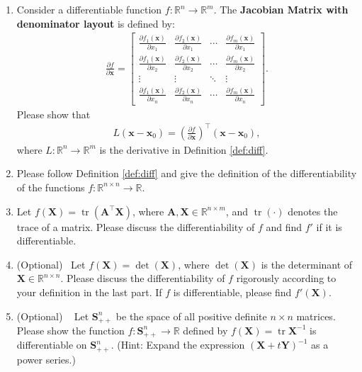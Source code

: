 \documentclass[11pt,letter,notitlepage]{article}
\newcommand{\tr}{ \operatorname{tr}  }
\theoremstyle{definition}
\begin{document}
\begin{exercise}
\begin{enumerate}
\begin{enumerate}
			\end{enumerate}
            \item Consider a differentiable function $f:\mathbb{R}^n\to\mathbb{R}^m$. The \textbf{Jacobian Matrix with denominator layout} is defined by:
            \begin{align*}
                \frac{\partial f}{\partial \mathbf{x}} = \left[
                \begin{matrix}
                    \displaystyle \frac{\partial f_1 (\mathbf{x})}{\partial x_1} & \displaystyle\frac{\partial f_2 (\mathbf{x})}{\partial x_1} & \cdots & \displaystyle\frac{\partial f_m (\mathbf{x})}{\partial x_1} \\
                    \displaystyle\frac{\partial f_1 (\mathbf{x})}{\partial x_2} & \displaystyle\frac{\partial f_2 (\mathbf{x})}{\partial x_2} & \cdots & \displaystyle\frac{\partial f_m (\mathbf{x})}{\partial x_2} \\
                    \vdots & \vdots & \ddots & \vdots \\
                    \displaystyle \frac{\partial f_1 (\mathbf{x})}{\partial x_n} & \displaystyle\frac{\partial f_2 (\mathbf{x})}{\partial x_n} & \cdots & \displaystyle\frac{\partial f_m (\mathbf{x})}{\partial x_n}
                \end{matrix}\right].
            \end{align*}
            Please show that
            \begin{align*}
                L(\mathbf{x} - \mathbf{x}_0) = \left( \frac{\partial f}{\partial \mathbf{x}} \right)^\top (\mathbf{x} - \mathbf{x}_0),
            \end{align*}
            where $L:\mathbb{R}^n\to\mathbb{R}^m$ is the derivative in Definition \ref{def:diff}.
			\item Please follow Definition \ref{def:diff} and give the definition of the differentiability of the functions $f:\mathbb{R}^{n\times n}\rightarrow\mathbb{R}$.
			\item Let $f(\mathbf{X})=\tr(\mathbf{A}^{\top}\mathbf{X})$, where $\mathbf{A},\mathbf{X}\in\mathbb{R}^{n\times m}$, and $\tr(\cdot)$ denotes the trace of a matrix. Please discuss the differentiability of $f$ and find $f'$ if it is differentiable.
			\item (Optional)~ Let $f(\mathbf{X}) = \det(\mathbf{X})$, where $\det(\mathbf{X})$ is the determinant of $\mathbf{X} \in \mathbb{R}^{n \times n}$. Please discuss the differentiability of $f$ rigorously according to your definition in the last part. If $f$ is differentiable, please find $f'(\mathbf{X})$.
			\item (Optional) ~ Let $\mathbf{S}_{++}^n$ be the space of all positive definite $n\times n$ matrices. Please show the function $f: \mathbf{S}_{++}^{n} \rightarrow \mathbb{R}$ defined by $f(\mathbf{X})=\tr{\mathbf{X}^{-1}}$ is differentiable on $ \mathbf{S}_{++}^{n} $. (Hint: Expand the expression $(\mathbf{X}+t\mathbf{Y})^{-1}$ as a power series.)
		\end{enumerate}
	\end{exercise}
\end{document}
